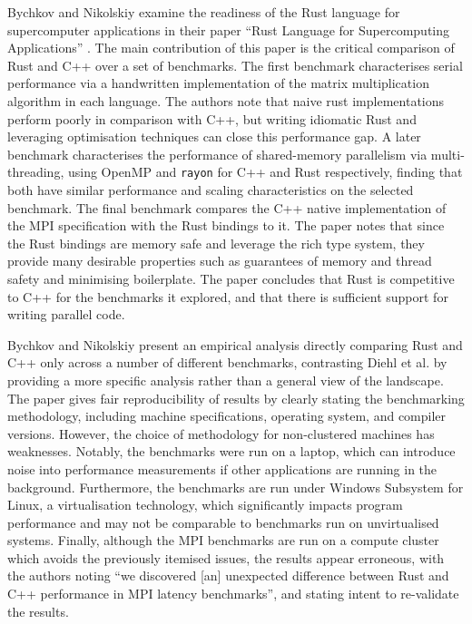 Bychkov and Nikolskiy examine the readiness of the Rust language for supercomputer applications in their paper ``Rust Language for Supercomputing Applications'' \cite{bychkovRustLanguageSupercomputing2021}. The main contribution of this paper is the critical comparison of Rust and C++ over a set of benchmarks. The first benchmark characterises serial performance via a handwritten implementation of the matrix multiplication algorithm in each language. The authors note that naive rust implementations perform poorly in comparison with C++, but writing idiomatic Rust and leveraging optimisation techniques can close this performance gap. A later benchmark characterises the performance of shared-memory parallelism via multi-threading, using OpenMP and \texttt{rayon} for C++ and Rust respectively, finding that both have similar performance and scaling characteristics on the selected benchmark. The final benchmark compares the C++ native implementation of the MPI specification with the Rust bindings to it. The paper notes that since the Rust bindings are memory safe and leverage the rich type system, they provide many desirable properties such as guarantees of memory and thread safety and minimising boilerplate. The paper concludes that Rust is competitive to C++ for the benchmarks it explored, and that there is sufficient support for writing parallel code.

Bychkov and Nikolskiy present an empirical analysis directly comparing Rust and C++ only across a number of different benchmarks, contrasting Diehl et al. by providing a more specific analysis rather than a general view of the landscape. The paper gives fair reproducibility of results by clearly stating the benchmarking methodology, including machine specifications, operating system, and compiler versions. However, the choice of methodology for non-clustered machines has weaknesses. Notably, the benchmarks were run on a laptop, which can introduce noise into performance measurements if other applications are running in the background. Furthermore, the benchmarks are run under Windows Subsystem for Linux, a virtualisation technology, which significantly impacts program performance and may not be comparable to benchmarks run on unvirtualised systems. Finally, although the MPI benchmarks are run on a compute cluster which avoids the previously itemised issues, the results appear erroneous, with the authors noting ``we discovered [an] unexpected difference between Rust and C++ performance in MPI latency benchmarks'', and stating intent to re-validate the results.

